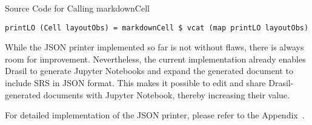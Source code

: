 \begin{listing}[h]
	\caption{Source Code for Calling markdownCell}
	\label{code:callmarkdownCell}
	\begin{lstlisting}[language=haskell1]
		printLO (Cell layoutObs) = markdownCell $ vcat (map printLO layoutObs)
	\end{lstlisting}
\end{listing}

While the JSON printer implemented so far is not without flaws, there is always 
room for improvement.  Nevertheless, the current 
implementation already enables Drasil to generate Jupyter Notebooks and expand 
the generated document to include SRS in JSON format. This makes it possible to 
edit and share Drasil-generated documents with Jupyter Notebook, thereby 
increasing their value.
 
For detailed implementation of the JSON printer, please refer to the 
Appendix~.